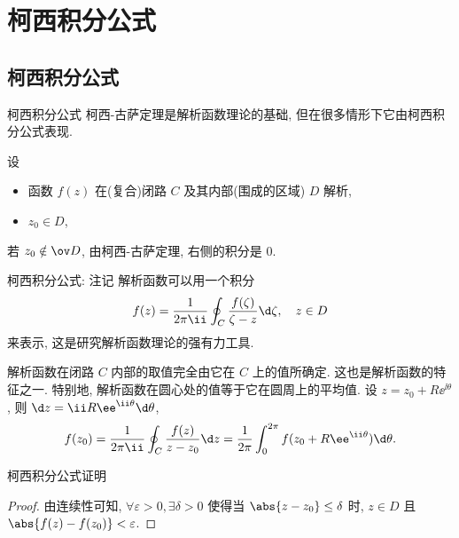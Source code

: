 \section{柯西积分公式}

\subsection{柯西积分公式}

\begin{frame}{柯西积分公式}
	\onslide<+->
	柯西-古萨定理是解析函数理论的基础, 但在很多情形下它由柯西积分公式表现.
	\onslide<+->
	\begin{theorem*}[][柯西积分公式]
		设
		\begin{itemize}[<*>]
			\item 函数 $f(z)$ 在(复合)闭路 $C$ 及其内部(围成的区域) $D$ 解析,
			\item $z_0\in D$,
		\end{itemize}
	\end{theorem*}
	\onslide<+->
	若 $z_0\notin \ov D$, 由柯西-古萨定理, 右侧的积分是 $0$.
\end{frame}


\begin{frame}{柯西积分公式: 注记}
	\onslide<+->
	解析函数可以用一个积分
	\[
		f(z)=\frac1{2\pi\ii}\oint_C\frac{f(\zeta)}{\zeta-z}\d\zeta,\quad z\in D
	\]
	来表示, 这是研究解析函数理论的强有力工具.

	\onslide<+->
	解析函数在闭路 $C$ 内部的取值完全由它在 $C$ 上的值所确定. 这也是解析函数的特征之一.
	\onslide<+->
	特别地, 解析函数在圆心处的值等于它在圆周上的平均值.
	\onslide<+->
	设 $z=z_0+R\ee^{\ii\theta}$, 则 $\d z=\ii R\ee^{\ii\theta}\d\theta$,
	\onslide<+->
	\[
		f(z_0)=\frac1{2\pi\ii}\oint_C\frac{f(z)}{z-z_0}\d z
		=\frac1{2\pi}\int_0^{2\pi}f(z_0+R\ee^{\ii\theta})\d\theta.
	\]
\end{frame}


\begin{frame}{柯西积分公式证明\noexer}
	\onslide<+->
	\begin{proof}
		由连续性可知, $\forall\varepsilon>0,\exists\delta>0$ 使得当 $\abs{z-z_0}\le\delta$ 时, $z\in D$ 且 $\abs{f(z)-f(z_0)}<\varepsilon$.
		\onslide<+->{%
			由 $\varepsilon$ 的任意性可知 
			\[
				\doint_C\frac{f(z)}{z-z_0}\d z=2\pi\ii f(z_0).\qedhere
			\]
		}
	\end{proof}
\end{frame}


